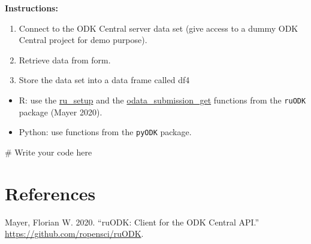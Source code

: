 \documentclass[
  letterpaper,
  DIV=11,
  numbers=noendperiod]{scrartcl}
\newenvironment{Shaded}{\begin{snugshade}}{\end{snugshade}}
\newcommand{\CommentTok}[1]{\textcolor[rgb]{0.37,0.37,0.37}{#1}}
\providecommand{\tightlist}{%
  \setlength{\itemsep}{0pt}\setlength{\parskip}{0pt}}\usepackage{longtable,booktabs,array}
\newlength{\cslhangindent}
\newlength{\cslentryspacingunit} %
\newenvironment{CSLReferences}[2] %
 {%
  \setlength{\parindent}{0pt}
  \ifodd #1
  \let\oldpar\par
  \def\par{\hangindent=\cslhangindent\oldpar}
  \fi
  \setlength{\parskip}{#2\cslentryspacingunit}
 }%
 {}
\begin{document}
\textbf{Instructions:}

\begin{enumerate}
\def\labelenumi{\arabic{enumi}.}
\tightlist
\item
  Connect to the ODK Central server data set (give access to a dummy ODK
  Central project for demo purpose).
\item
  Retrieve data from form.
\item
  Store the data set into a data frame called df4
\end{enumerate}

\begin{tcolorbox}[enhanced jigsaw, arc=.35mm, coltitle=black, toprule=.15mm, bottomtitle=1mm, colbacktitle=quarto-callout-tip-color!10!white, bottomrule=.15mm, titlerule=0mm, rightrule=.15mm, colframe=quarto-callout-tip-color-frame, title=\textcolor{quarto-callout-tip-color}{\faLightbulb}\hspace{0.5em}{Tip}, breakable, opacityback=0, opacitybacktitle=0.6, toptitle=1mm, leftrule=.75mm, colback=white, left=2mm]

\begin{itemize}
\tightlist
\item
  R: use the
  \href{https://docs.ropensci.org/ruODK/reference/ru_setup.html}{ru\_setup}
  and the
  \href{https://docs.ropensci.org/ruODK/reference/odata_submission_get.html}{odata\_submission\_get}
  functions from the \texttt{ruODK} package (Mayer 2020).
\item
  Python: use functions from the \texttt{pyODK} package.
\end{itemize}

\end{tcolorbox}

\begin{Shaded}
\begin{Highlighting}[]
\CommentTok{\# Write your code here}
\end{Highlighting}
\end{Shaded}

\hypertarget{references}{%
\section*{References}\label{references}}

\hypertarget{refs}{}
\begin{CSLReferences}{1}{0}
\leavevmode{}%
Mayer, Florian W. 2020. {``ruODK: Client for the ODK Central API.''}
\url{https://github.com/ropensci/ruODK}.

\end{CSLReferences}
\end{document}
